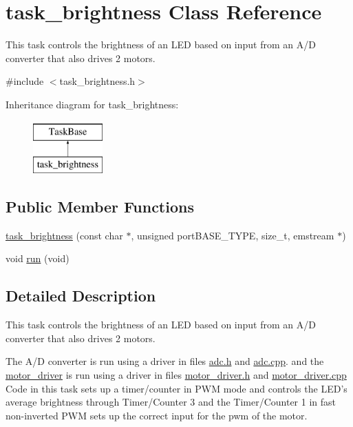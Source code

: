 \hypertarget{classtask__brightness}{\section{task\-\_\-brightness Class Reference}
\label{classtask__brightness}
}


This task controls the brightness of an L\-E\-D based on input from an A/\-D converter that also drives 2 motors.  




{\ttfamily \#include $<$task\-\_\-brightness.\-h$>$}

Inheritance diagram for task\-\_\-brightness\-:\begin{figure}[H]
\begin{center}
\leavevmode
\includegraphics[height=2.000000cm]{classtask__brightness}
\end{center}
\end{figure}
\subsection*{Public Member Functions}
\begin{DoxyCompactItemize}
\item 
\hyperlink{classtask__brightness_a5802baf3a0c9fe53ccbce8966d1fad47}{task\-\_\-brightness} (const char $\ast$, unsigned port\-B\-A\-S\-E\-\_\-\-T\-Y\-P\-E, size\-\_\-t, emstream $\ast$)
\item 
void \hyperlink{classtask__brightness_a615beac07a99f0856f048a46fd9a3898}{run} (void)
\end{DoxyCompactItemize}


\subsection{Detailed Description}
This task controls the brightness of an L\-E\-D based on input from an A/\-D converter that also drives 2 motors. 

The A/\-D converter is run using a driver in files {\ttfamily \hyperlink{adc_8h}{adc.\-h}} and {\ttfamily \hyperlink{adc_8cpp}{adc.\-cpp}}. and the \hyperlink{classmotor__driver}{motor\-\_\-driver} is run using a driver in files {\ttfamily \hyperlink{motor__driver_8h}{motor\-\_\-driver.\-h}} and {\ttfamily \hyperlink{motor__driver_8cpp}{motor\-\_\-driver.\-cpp}} Code in this task sets up a timer/counter in P\-W\-M mode and controls the L\-E\-D's average brightness through Timer/\-Counter 3 and the Timer/\-Counter 1 in fast non-\/inverted P\-W\-M sets up the correct input for the pwm of the motor. 

